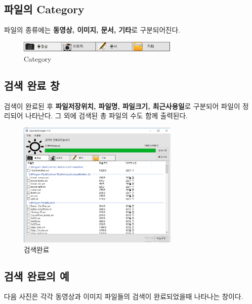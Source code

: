 \documentclass[a4paper, 13pt]{article} %
\begin{document}
	\subsection{파일의 Category}
	파일의 종류에는 \textbf{동영상, 이미지, 문서, 기타}로 구분되어진다.
	
	\begin{figure}[h]
		\centering
		\includegraphics[width=0.7\textwidth]{Figures/catalog}
		\caption{Category}
		\label{fig:category}
	\end{figure}

	\subsection{검색 완료 창}
	검색이 완료된 후 \textbf{파일저장위치, 파일명, 파일크기, 최근사용일}로 구분되어 파일이 정리되어 나타난다.
	그 외에 검색된 총 파일의 수도 함께 출력된다.
		
	\begin{figure}[h]
		\centering
		\includegraphics[width=0.7\textwidth]{Figures/complete}
		\caption{검색완료}
		\label{fig:complete}
	\end{figure}

	\subsection{검색 완료의 예}
	다음 사진은 각각 동영상과 이미지 파일들의 검색이 완료되었을때 나타나는 창이다.
\end{document}
